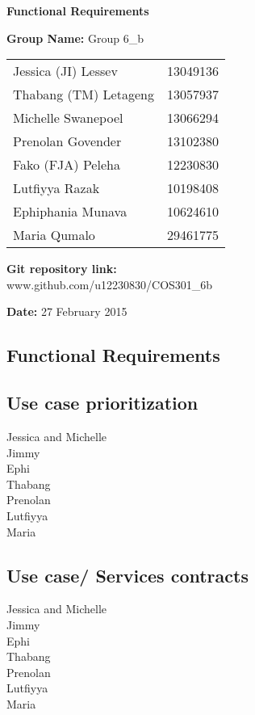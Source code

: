 \documentclass[a4paper,11pt]{article}
\begin{document}
\begin{center}

\LARGE\textbf{Functional Requirements\\}
																											
\vspace{2 cm}
\textbf{Group Name:} Group 6\_b\newline
 
\vspace{0.5 cm}
\begin{tabular}{lr}
Jessica (JI) Lessev&13049136\\
Thabang (TM) Letageng&13057937\\
Michelle Swanepoel&13066294\\
Prenolan Govender&13102380\\
Fako (FJA) Peleha&12230830\\
Lutfiyya Razak&10198408\\
Ephiphania Munava&10624610\\
Maria Qumalo&29461775\\
\end{tabular}

\vspace{1cm}
\textbf{Git repository link:\\}
www.github.com/u12230830/COS301\_6b

\vspace{1cm}
\textbf{Date:} 27 February 2015
\end{center}




\newpage
\begin{center}
\section{Functional Requirements}
\end{center}


\subsection{Use case prioritization}
Jessica and Michelle\\
Jimmy\\
Ephi\\
Thabang\\
Prenolan\\
Lutfiyya\\
Maria\\


\subsection{Use case/ Services contracts}
Jessica and Michelle\\
Jimmy\\
Ephi\\
Thabang\\
Prenolan\\
Lutfiyya\\
Maria\\
\end{document}
